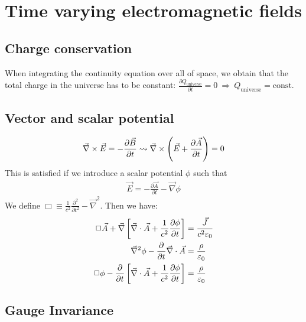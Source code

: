 \section{Time varying electromagnetic fields}

\subsection{Charge conservation}

When integrating the continuity equation over all of space, we obtain that
the total charge in the universe has to be constant:
$\frac{\partial Q_{\text{universe}}}{\partial t} = 0 \ \Rightarrow \
Q_{\text{universe}} = \text{const}$.

\subsection{Vector and scalar potential}

\begin{align*}
    \vec{\nabla} \times \vec{E} = - \frac{\partial \vec{B}}{\partial t}
    \rightsquigarrow \vec{\nabla} \times \left( \vec{E} + \frac{\partial \vec{A}}{\partial t} \right) = 0
\end{align*}
This is satisfied if we introduce a scalar potential $\phi$ such that
\begin{align*}
    \vec{E} = - \frac{\partial \vec{A}}{\partial t} - \vec{\nabla} \phi
\end{align*}
We define $\Box \equiv \frac{1}{c^2} \frac{\partial^2}{\partial t^2} - \vec{\nabla}^2$.
Then we have:
\begin{align*}
    \Box \vec{A} + \vec{\nabla} \left[ \vec{\nabla} \cdot \vec{A} +
        \frac{1}{c^2} \frac{\partial \phi}{\partial t} \right] &= \frac{\vec{J}}{c^2 \varepsilon_0}
    \\
    \vec{\nabla}^2 \phi - \frac{\partial}{\partial t} \vec{\nabla} \cdot \vec{A} &= \frac{\rho}{\varepsilon_0}
    \\
    \Box \phi - \frac{\partial}{\partial t} \left[ \vec{\nabla} \cdot \vec{A} +
    \frac{1}{c^2} \frac{\partial \phi}{\partial t} \right] &= \frac{\rho}{\varepsilon_0}
\end{align*}

\subsection{Gauge Invariance}

